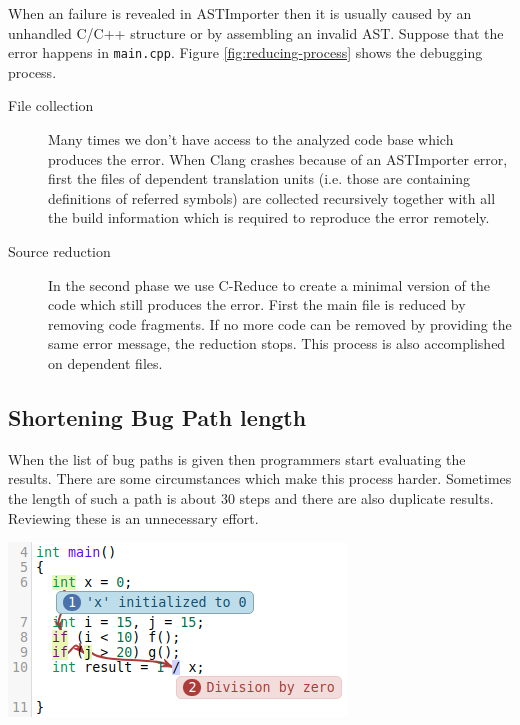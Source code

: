 \documentclass[a0,portrait]{a0poster}
\begin{document}
\begin{multicols}{2}
When an failure is revealed in ASTImporter then it is usually caused by an 
unhandled C/C++ structure or by assembling an invalid AST. Suppose that the 
error happens in \texttt{main.cpp}. Figure \ref{fig:reducing-process} shows the 
debugging process.
\begin{description}
  \item[File collection] Many times we don't have access to the analyzed code 
  base which produces the error. When Clang crashes because of an ASTImporter 
  error, first the files of dependent translation units (i.e. those are 
  containing definitions of referred symbols) are collected recursively 
  together with all the build information which is required to reproduce the 
  error remotely.
  
  \item[Source reduction] In the second phase we use C-Reduce \cite{creduce} to 
  create a minimal version of the code which still produces the error. First 
  the main file is reduced by removing code fragments. If no more code can be 
  removed by providing the same error message, the reduction stops. This 
  process is also accomplished on dependent files.
\end{description}


\subsection*{Shortening Bug Path length}

When the list of bug paths is given then programmers start evaluating the 
results. There are some circumstances which make this process harder. Sometimes 
the length of such a path is about 30 steps and there are also duplicate 
results. Reviewing these is an unnecessary effort.

\begin{center}\vspace{1cm}
  \includegraphics[width=0.5\linewidth]{bugpath}
  \label{fig:bugpath}
\end{center}\vspace{1cm}


\end{multicols}
\end{document}
